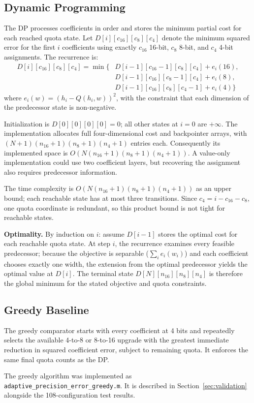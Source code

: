 
\subsection{Dynamic Programming}

The DP processes coefficients in order and stores the minimum partial
cost for each reached quota state. Let
$D[i][c_{16}][c_8][c_4]$ denote the minimum squared error for the first
$i$ coefficients using exactly $c_{16}$ 16-bit, $c_8$ 8-bit, and $c_4$
4-bit assignments. The recurrence is:
\begin{align}
D[i][c_{16}][c_8][c_4] = \min\bigl\{& D[i\!-\!1][c_{16}\!-\!1][c_8][c_4] + e_i(16),\nonumber\\
& D[i\!-\!1][c_{16}][c_8\!-\!1][c_4] + e_i(8),\nonumber\\
& D[i\!-\!1][c_{16}][c_8][c_4\!-\!1] + e_i(4)\bigr\}
\label{eq:dp_recurrence}
\end{align}
where $e_i(w) = (h_i - Q(h_i, w))^2$, with the constraint that each
dimension of the predecessor state is non-negative.

Initialization is $D[0][0][0][0]=0$; all other states at $i=0$ are
$+\infty$. The implementation allocates full four-dimensional cost and
backpointer arrays, with $(N+1)(n_{16}+1)(n_8+1)(n_4+1)$ entries each.
Consequently its implemented space is
$O(N(n_{16}+1)(n_8+1)(n_4+1))$. A value-only implementation could use two
coefficient layers, but recovering the assignment also requires predecessor
information.

The time complexity is
$O(N(n_{16}+1)(n_8+1)(n_4+1))$ as an upper bound; each reachable state has
at most three transitions. Since $c_4=i-c_{16}-c_8$, one quota coordinate
is redundant, so this product bound is not tight for reachable states.

\textbf{Optimality.} By induction on $i$: assume
$D[i\!-\!1]$ stores the optimal cost for each reachable quota state. At
step $i$, the recurrence examines every feasible predecessor; because
the objective is separable ($\sum_i e_i(w_i)$) and each coefficient
chooses exactly one width, the extension from the optimal predecessor
yields the optimal value at $D[i]$. The terminal state
$D[N][n_{16}][n_8][n_4]$ is therefore the global minimum for the stated
objective and quota constraints.

\subsection{Greedy Baseline}

The greedy comparator starts with every coefficient at 4 bits and
repeatedly selects the available 4-to-8 or 8-to-16 upgrade with the
greatest immediate reduction in squared coefficient error, subject to
remaining quota. It enforces the same final quota counts as the DP.

The greedy algorithm was implemented as
\texttt{adaptive\_precision\_error\_greedy.m}. It is described in
Section~\ref{sec:validation} alongside the 108-configuration test
results.
